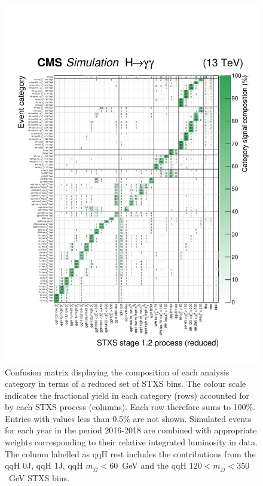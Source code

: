 \begin{figure}[hptb]
  \centering
  \includegraphics[width=1\textwidth]{Figures/hgg_overview/purityMatrix_thesis.pdf}
  \caption[Confusion matrix for the full set of analysis categories]
  {
    Confusion matrix displaying the composition of each analysis category in terms of a reduced set of STXS bins. The colour scale indicates the fractional yield in each category (rows) accounted for by each STXS process (columns). Each row therefore sums to 100\%. Entries with values less than 0.5\% are not shown. Simulated events for each year in the period 2016-2018 are combined with appropriate weights corresponding to their relative integrated luminosity in data. The column labelled as qqH rest includes the contributions from the qqH 0J, qqH 1J, qqH $m_{jj}<60$~GeV and the qqH $120<m_{jj}<350$~GeV STXS bins.
  }
  \label{fig:purity_matrix}
\end{figure}




